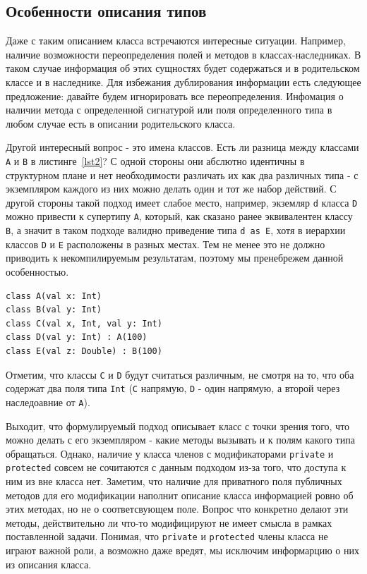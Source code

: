\documentclass[times,specification,annotation]{itmo-student-thesis}
\begin{document}
\subsection{Особенности описания типов}\label{typeDescr}
Даже с таким описанием класса встречаются интересные ситуации. Например, наличие возможности переопределения полей и методов в классах-наследниках. В таком случае информация об этих сущностях будет содержаться и в родительском классе и в наследнике. Для избежания дублирования информации есть следующее предложение: давайте будем игнорировать все переопределения. Инфомация о наличии метода с определенной сигнатурой или поля определенного типа в любом случае есть в описании родительского класса.

Другой интересный вопрос - это имена классов. Есть ли разница между классами \texttt{A} и \texttt{B} в листинге~\ref{lst2}? С одной стороны они абслютно идентичны в структурном плане и нет необходимости различать их как два различных типа - с экземпляром каждого из них можно делать один и тот же набор действий. С другой стороны такой подход имеет слабое место, например, экземляр \texttt{d} класса \texttt{D} можно привести к супертипу \texttt{A}, который, как сказано ранее эквивалентен классу \texttt{B}, а значит в таком подходе валидно приведение типа \texttt{d as E}, хотя в иерархии классов \texttt{D} и \texttt{E} расположены в разных местах. Тем не менее это не должно приводить к некомпилируемым результатам, поэтому мы пренебрежем данной особенностью.

\begin{lstlisting}[float=!h,caption={Пример исходного кода на Kotlin},label={lst2}]
class A(val x: Int)
class B(val y: Int)
class C(val x, Int, val y: Int)
class D(val y: Int) : A(100)
class E(val z: Double) : B(100)
\end{lstlisting}

Отметим, что классы \texttt{C} и \texttt{D} будут считаться различным, не смотря на то, что оба содержат два поля типа \texttt{Int} (\texttt{C} напрямую, \texttt{D} - один напрямую, а второй через наследоавние от \texttt{А}).

Выходит, что формулируемый подход описывает класс с точки зрения того, что можно делать с его экземпляром - какие методы вызывать и к полям какого типа обращаться. Однако, наличие у класса членов с модификаторами \texttt{private} и \texttt{protected} совсем не сочитаются с данным подходом из-за того, что доступа к ним из вне класса нет. Заметим, что наличие для приватного поля публичных методов для его модификации наполнит описание класса информацией ровно об этих методах, но не о соответсвующем поле. Вопрос что конкретно делают эти методы, действительно ли что-то модифицируют не имеет смысла в рамках поставленной задачи. Понимая, что \texttt{private} и \texttt{protected} члены класса не играют важной роли, а возможно даже вредят, мы исключим информарцию о них из описания класса.
\end{document}

